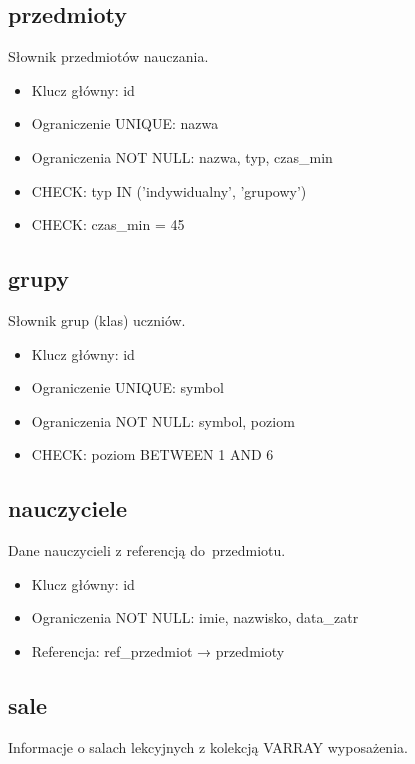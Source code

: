 \documentclass[12pt,a4paper]{article}
\begin{document}
\subsection{przedmioty}

Słownik przedmiotów nauczania.

\begin{itemize}[nosep]
    \item Klucz główny: id
    \item Ograniczenie UNIQUE: nazwa
    \item Ograniczenia NOT NULL: nazwa, typ, czas\_min
    \item CHECK: typ IN ('indywidualny', 'grupowy')
    \item CHECK: czas\_min = 45
\end{itemize}

\subsection{grupy}

Słownik grup (klas) uczniów.

\begin{itemize}[nosep]
    \item Klucz główny: id
    \item Ograniczenie UNIQUE: symbol
    \item Ograniczenia NOT NULL: symbol, poziom
    \item CHECK: poziom BETWEEN 1 AND 6
\end{itemize}

\subsection{nauczyciele}

Dane nauczycieli z referencją do~przedmiotu.

\begin{itemize}[nosep]
    \item Klucz główny: id
    \item Ograniczenia NOT NULL: imie, nazwisko, data\_zatr
    \item Referencja: ref\_przedmiot → przedmioty
\end{itemize}

\subsection{sale}

Informacje o salach lekcyjnych z kolekcją VARRAY wyposażenia.
\end{document}
